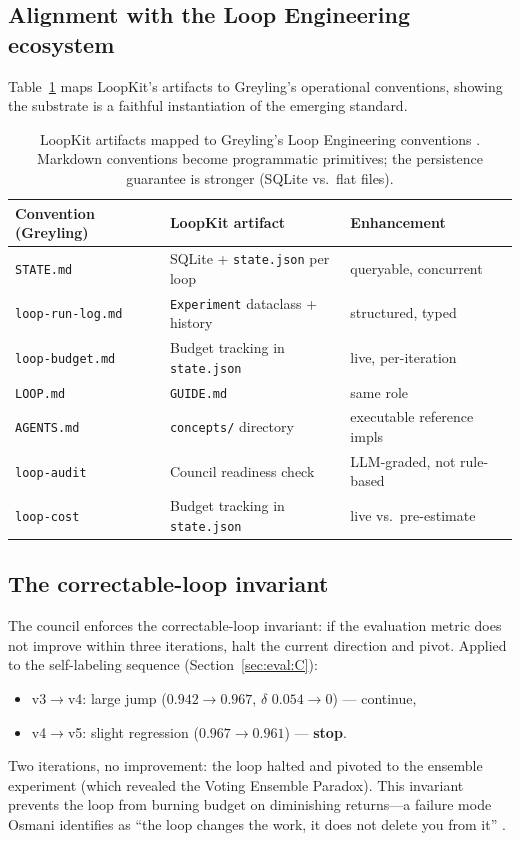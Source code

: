 \subsection{Alignment with the Loop Engineering ecosystem}
\label{sec:loopkit:ecosystem}

Table~\ref{tab:ecosystem} maps LoopKit's artifacts to Greyling's operational
conventions, showing the substrate is a faithful instantiation of the
emerging standard.

\begin{table}[h]
\centering
\caption{LoopKit artifacts mapped to Greyling's Loop Engineering conventions
\citep{greyling2026loop}. Markdown conventions become programmatic
primitives; the persistence guarantee is stronger (SQLite vs.\ flat files).}
\label{tab:ecosystem}
\begin{tabular}{lll}
\toprule
Convention (Greyling) & LoopKit artifact & Enhancement \\
\midrule
\texttt{STATE.md}          & SQLite + \texttt{state.json} per loop & queryable, concurrent \\
\texttt{loop-run-log.md}   & \texttt{Experiment} dataclass + history & structured, typed \\
\texttt{loop-budget.md}    & Budget tracking in \texttt{state.json} & live, per-iteration \\
\texttt{LOOP.md}           & \texttt{GUIDE.md} & same role \\
\texttt{AGENTS.md}         & \texttt{concepts/} directory & executable reference impls \\
\texttt{loop-audit}        & Council readiness check & LLM-graded, not rule-based \\
\texttt{loop-cost}         & Budget tracking in \texttt{state.json} & live vs.\ pre-estimate \\
\bottomrule
\end{tabular}
\end{table}

\subsection{The correctable-loop invariant}
\label{sec:loopkit:correctable}

The council enforces the correctable-loop invariant: if the evaluation
metric does not improve within three iterations, halt the current direction
and pivot. Applied to the self-labeling sequence
(Section~\ref{sec:eval:C}):
\begin{itemize}
  \item v3$\to$v4: large jump ($0.942\to0.967$, $\delta$ $0.054\to0$) ---
        continue,
  \item v4$\to$v5: slight regression ($0.967\to0.961$) --- \textbf{stop}.
\end{itemize}
Two iterations, no improvement: the loop halted and pivoted to the ensemble
experiment (which revealed the Voting Ensemble Paradox). This invariant
prevents the loop from burning budget on diminishing returns---a failure
mode Osmani identifies as ``the loop changes the work, it does not delete you
from it'' \citep{osmani2026loop}.

